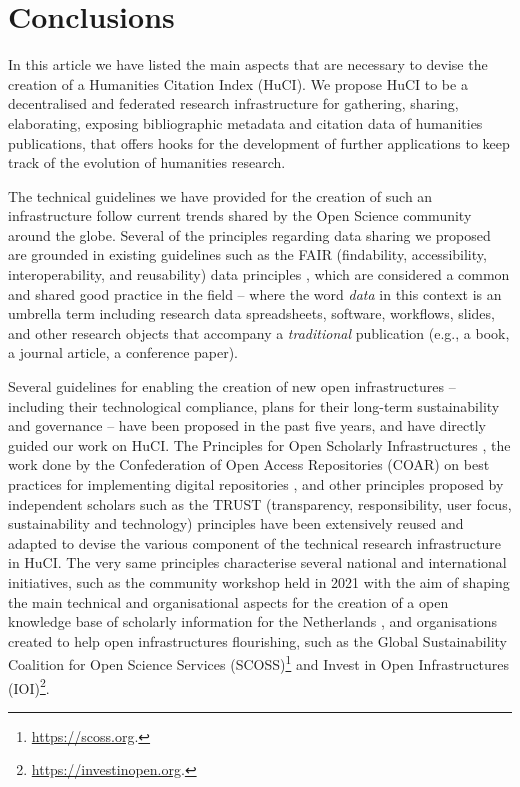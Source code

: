 \section{Conclusions} \label{sec:conclusions}

In this article we have listed the main aspects that are necessary to devise the creation of a Humanities Citation Index (HuCI). We propose HuCI to be a decentralised and federated research infrastructure for gathering, sharing, elaborating, exposing bibliographic metadata and citation data of humanities publications, that offers hooks for the development of further applications to keep track of the evolution of humanities research. 

The technical guidelines we have provided for the creation of such an infrastructure follow current trends shared by the Open Science community around the globe. Several of the principles regarding data sharing we proposed are grounded in existing guidelines such as the FAIR (findability, accessibility, interoperability, and reusability) data principles \cite{wilkinson_fair_2016}, which are considered a common and shared good practice in the field -- where the word \emph{data} in this context is an umbrella term including research data spreadsheets, software, workflows, slides, and other research objects that accompany a \emph{traditional} publication (e.g., a book, a journal article, a conference paper).

Several guidelines for enabling the creation of new open infrastructures -- including their technological compliance, plans for their long-term sustainability and governance -- have been proposed in the past five years, and have directly guided our work on HuCI. The Principles for Open Scholarly Infrastructures \cite{bilder_principles_2020}, the work done by the Confederation of Open Access Repositories (COAR) on best practices for implementing digital repositories \cite{coar_wg_next_generation_repositories_behaviours_2017, confederation_of_open_access_repositories_coar_2020}, and other principles proposed by independent scholars such as the TRUST (transparency, responsibility, user focus, sustainability and technology) principles \cite{lin_trust_2020} have been extensively reused and adapted to devise the various component of the technical research infrastructure in HuCI. The very same principles characterise several national and international initiatives, such as the community workshop held in 2021 with the aim of shaping the main technical and organisational aspects for the creation of a open knowledge base of scholarly information for the Netherlands \cite{neylon_open_2021}, and organisations created to help open infrastructures flourishing, such as the Global Sustainability Coalition for Open Science Services (SCOSS)\footnote{\url{https://scoss.org}.} and Invest in Open Infrastructures (IOI)\footnote{\url{https://investinopen.org}.}.

